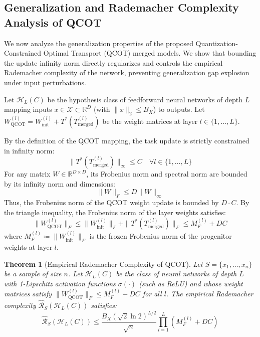 \documentclass{article}
\theoremstyle{plain}
\newtheorem{theorem}{Theorem}[section]
\theoremstyle{definition}
\theoremstyle{remark}
\begin{document}
\subsection{Generalization and Rademacher Complexity Analysis of QCOT}
\label{sec:proof_generalization}

We now analyze the generalization properties of the proposed Quantization-Constrained Optimal Transport (QCOT) merged models. We show that bounding the update infinity norm directly regularizes and controls the empirical Rademacher complexity of the network, preventing generalization gap explosion under input perturbations.

Let $\mathcal{H}_L(C)$ be the hypothesis class of feedforward neural networks of depth $L$ mapping inputs $x \in \mathcal{X} \subset \mathbb{R}^D$ (with $\|x\|_2 \le B_X$) to outputs. Let $W_{\text{QCOT}}^{(l)} = W_{\text{init}}^{(l)} + T^*(T_{\text{merged}}^{(l)})$ be the weight matrices at layer $l \in \{1, \dots, L\}$. 

By the definition of the QCOT mapping, the task update is strictly constrained in infinity norm:
\begin{equation}
    \|T^*(T_{\text{merged}}^{(l)})\|_{\infty} \le C \quad \forall l \in \{1, \dots, L\}
\end{equation}
For any matrix $W \in \mathbb{R}^{D \times D}$, its Frobenius norm and spectral norm are bounded by its infinity norm and dimensions:
\begin{equation}
    \|W\|_F \le D \|W\|_{\infty}
\end{equation}
Thus, the Frobenius norm of the QCOT weight update is bounded by $D \cdot C$. By the triangle inequality, the Frobenius norm of the layer weights satisfies:
\begin{equation}
    \|W_{\text{QCOT}}^{(l)}\|_F \le \|W_{\text{init}}^{(l)}\|_F + \|T^*(T_{\text{merged}}^{(l)})\|_F \le M_F^{(l)} + D C
\end{equation}
where $M_F^{(l)} \coloneqq \|W_{\text{init}}^{(l)}\|_F$ is the frozen Frobenius norm of the progenitor weights at layer $l$.

\begin{theorem}[Empirical Rademacher Complexity of QCOT]
Let $S = \{x_1, \dots, x_n\}$ be a sample of size $n$. Let $\mathcal{H}_L(C)$ be the class of neural networks of depth $L$ with 1-Lipschitz activation functions $\sigma(\cdot)$ (such as ReLU) and whose weight matrices satisfy $\|W_{\text{QCOT}}^{(l)}\|_F \le M_F^{(l)} + D C$ for all $l$. The empirical Rademacher complexity $\widehat{\mathcal{R}}_S(\mathcal{H}_L(C))$ satisfies:
\begin{equation}
    \widehat{\mathcal{R}}_S\left( \mathcal{H}_L(C) \right) \le \frac{B_X (\sqrt{2}\ln 2)^{L/2}}{\sqrt{n}} \prod_{l=1}^L \left( M_F^{(l)} + D C \right)
\end{equation}
\label{thm:rademacher_qcot}
\end{theorem}
\end{document}
